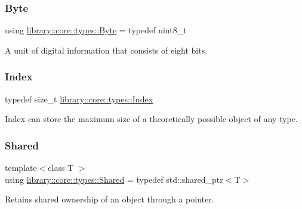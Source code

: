 \subsubsection{\texorpdfstring{Byte}{Byte}}
{\footnotesize\ttfamily using \hyperlink{namespacelibrary_1_1core_1_1types_ae37635b89098069fb3b8c5181edd0945}{library\+::core\+::types\+::\+Byte} = typedef uint8\+\_\+t}



A unit of digital information that consists of eight bits. 

\mbox{\label{namespacelibrary_1_1core_1_1types_ad87eeb821d7067ec94e06ed1980d6350}} 
\subsubsection{\texorpdfstring{Index}{Index}}
{\footnotesize\ttfamily typedef size\+\_\+t \hyperlink{namespacelibrary_1_1core_1_1types_ad87eeb821d7067ec94e06ed1980d6350}{library\+::core\+::types\+::\+Index}}



Index can store the maximum size of a theoretically possible object of any type. 

\mbox{\label{namespacelibrary_1_1core_1_1types_a3dae1a00f899bac0366794fa85eda8ee}} 
\subsubsection{\texorpdfstring{Shared}{Shared}}
{\footnotesize\ttfamily template$<$class T $>$ \\
using \hyperlink{namespacelibrary_1_1core_1_1types_a3dae1a00f899bac0366794fa85eda8ee}{library\+::core\+::types\+::\+Shared} = typedef std\+::shared\+\_\+ptr$<$T$>$}



Retains shared ownership of an object through a pointer. 

\mbox{\label{namespacelibrary_1_1core_1_1types_a701626ea1027888ebbb8cfd0ff7adab0}} 
